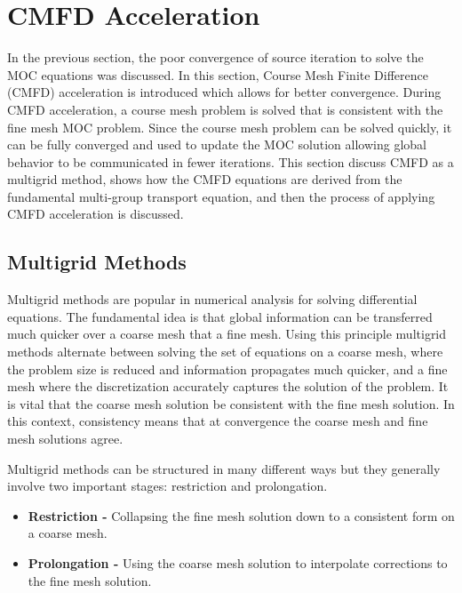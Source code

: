 \chapter{CMFD Acceleration}
\label{chap:cmfd}

In the previous section, the poor convergence of source iteration to solve the MOC equations was discussed. In this section, Course Mesh Finite Difference (CMFD) acceleration is introduced which allows for better convergence. During CMFD acceleration, a course mesh problem is solved that is consistent with the fine mesh MOC problem. Since the course mesh problem can be solved quickly, it can be fully converged and used to update the MOC solution allowing global behavior to be communicated in fewer iterations. This section discuss CMFD as a multigrid method, shows how the CMFD equations are derived from the fundamental multi-group transport equation, and then the process of applying CMFD acceleration is discussed.

\section{Multigrid Methods}
\label{sec:multigrid}

Multigrid methods are popular in numerical analysis for solving differential equations. The fundamental idea is that global information can be transferred much quicker over a coarse mesh that a fine mesh. Using this principle multigrid methods alternate between solving the set of equations on a coarse mesh, where the problem size is reduced and information propagates much quicker, and a fine mesh where the discretization accurately captures the solution of the problem. It is vital that the coarse mesh solution be consistent with the fine mesh solution. In this context, consistency means that at convergence the coarse mesh and fine mesh solutions agree.

Multigrid methods can be structured in many different ways but they generally involve two important stages: restriction and prolongation.
\begin{itemize}
	\item \textbf{Restriction - } Collapsing the fine mesh solution down to a consistent form on a coarse mesh.
	\item \textbf{Prolongation - } Using the coarse mesh solution to interpolate corrections to the fine mesh solution.
\end{itemize}

